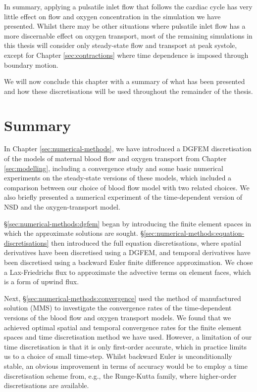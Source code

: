         In summary, applying a pulsatile inlet flow that follows the cardiac cycle has very little effect on flow and oxygen concentration in the simulation we have presented. Whilst there may be other situations where pulsatile inlet flow has a more discernable effect on oxygen transport, most of the remaining simulations in this thesis will consider only steady-state flow and transport at peak systole, except for Chapter \ref{sec:contractions} where time dependence is imposed through boundary motion.
        
        We will now conclude this chapter with a summary of what has been presented and how these discretisations will be used throughout the remainder of the thesis.        

    \section{Summary} \label{sec:numerical-methods:summary}
        In Chapter \ref{sec:numerical-methods}, we have introduced a DGFEM discretisation of the models of maternal blood flow and oxygen transport from Chapter \ref{sec:modelling}, including a convergence study and some basic numerical experiments on the steady-state versions of these models, which included a comparison between our choice of blood flow model with two related choices. We also briefly presented a numerical experiment of the time-dependent version of NSD and the oxygen-transport model.

        \S\ref{sec:numerical-methods:dgfem} began by introducing the finite element spaces in which the approximate solutions are sought. \S\ref{sec:numerical-methods:equation-discretisations} then introduced the full equation discretisations, where spatial derivatives have been discretised using a DGFEM, and temporal derivatives have been discretised using a backward Euler finite difference approximation. We chose a Lax-Friedrichs flux to approximate the advective terms on element faces, which is a form of upwind flux.

        Next, \S\ref{sec:numerical-methods:convergence} used the method of manufactured solution (MMS) to investigate the convergence rates of the time-dependent versions of the blood flow and oxygen transport models. We found that we achieved optimal spatial and temporal convergence rates for the finite element spaces and time discretisation method we have used. However, a limitation of our time discretisation is that it is only first-order accurate, which in practice limits us to a choice of small time-step. Whilst backward Euler is unconditionally stable, an obvious improvement in terms of accuracy would be to employ a time discretisation scheme from, e.g., the Runge-Kutta family, where higher-order discretisations are available.

